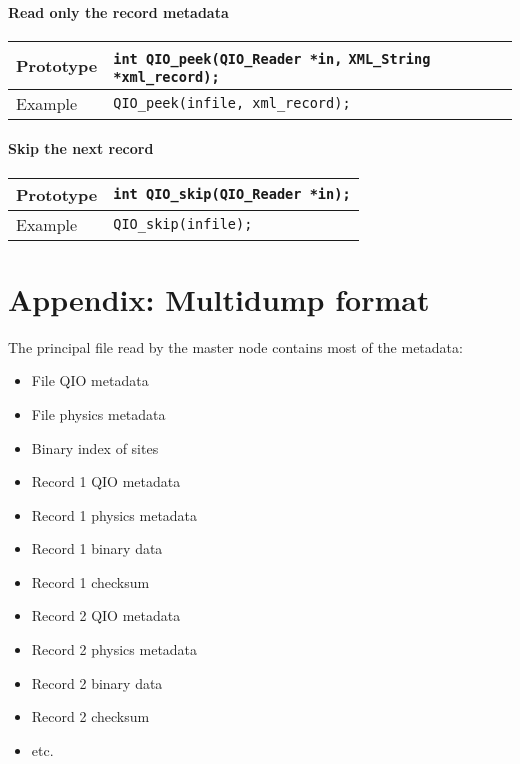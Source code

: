 \documentclass{article}
\newcommand{\QMDhandle}{{\tt XML\_String}}
\begin{document}
\paragraph{Read only the record metadata}

\begin{flushleft}
  \begin{tabular}{|l|l|}
  \hline
  Prototype      & \verb|int QIO_peek(QIO_Reader *in,| \QMDhandle\verb| *xml_record);| \\
\hline
  Example  & \verb|QIO_peek(infile, xml_record);|\\
   \hline
 \end{tabular}
\end{flushleft}
%

\paragraph{Skip the next record}

\begin{flushleft}
  \begin{tabular}{|l|l|}
  \hline
  Prototype      & \verb|int QIO_skip(QIO_Reader *in);| \\
\hline
  Example  & \verb|QIO_skip(infile);|\\
   \hline
 \end{tabular}
\end{flushleft}
%
 

\section{Appendix: Multidump format}

The principal file read by the master node contains most of the metadata:

\begin{itemize}
  \item File QIO metadata
  \item File physics metadata
  \item Binary index of sites
  \item Record 1 QIO metadata
  \item Record 1 physics metadata
  \item Record 1 binary data
  \item Record 1 checksum
  \item Record 2 QIO metadata
  \item Record 2 physics metadata
  \item Record 2 binary data
  \item Record 2 checksum
  \item etc.
\end{itemize}
\end{document}
